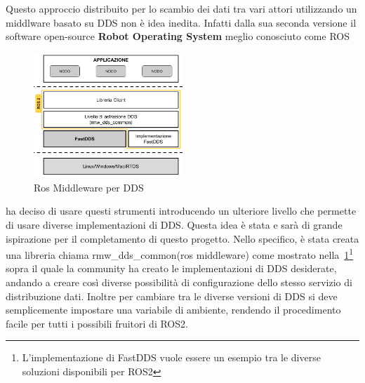 Questo approccio distribuito per lo scambio dei dati tra vari attori utilizzando un middlware basato su DDS non è idea inedita. Infatti dalla sua seconda versione il software open-source \textbf{Robot Operating System}\cite{ros2iron} meglio conosciuto come ROS
\begin{figure}
  \includegraphics[width=0.5\textwidth]{img/ROS_MW.png}
  \caption{Ros Middleware per DDS} 
  \label{fig:rmw_dds_common}
\end{figure}
ha deciso di usare questi strumenti introducendo un ulteriore livello che permette di usare diverse implementazioni di DDS. Questa idea è stata e sarà di grande ispirazione per il completamento di questo progetto.
Nello specifico, è stata creata una libreria chiama rmw\_dds\_common(ros middleware) come mostrato nella~\ref{fig:rmw_dds_common}\footnote{L'implementazione di FastDDS vuole essere un esempio tra le diverse soluzioni disponibili per ROS2} sopra il quale la community ha creato le implementazioni di DDS desiderate, andando a creare così diverse possibilità di configurazione dello stesso servizio di distribuzione dati.
Inoltre per cambiare tra le diverse versioni di DDS si deve semplicemente impostare una variabile di ambiente, rendendo il procedimento facile per tutti i possibili fruitori di ROS2. 

